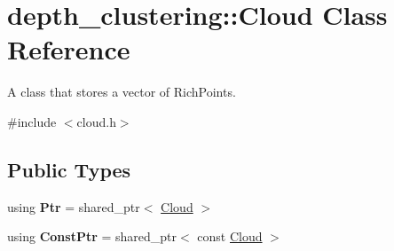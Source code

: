 \hypertarget{classdepth__clustering_1_1Cloud}{}\section{depth\+\_\+clustering\+:\+:Cloud Class Reference}
\label{classdepth__clustering_1_1Cloud}


A class that stores a vector of Rich\+Points.  




{\ttfamily \#include $<$cloud.\+h$>$}

\subsection*{Public Types}
\begin{DoxyCompactItemize}
\item 
\mbox{\label{classdepth__clustering_1_1Cloud_a6357719aeeb7c05cbd4a375f63526ba1}} 
using {\bfseries Ptr} = shared\+\_\+ptr$<$ \hyperlink{classdepth__clustering_1_1Cloud}{Cloud} $>$
\item 
\mbox{\label{classdepth__clustering_1_1Cloud_ae8ba86a4493a06d04e25cba4e97b9787}} 
using {\bfseries Const\+Ptr} = shared\+\_\+ptr$<$ const \hyperlink{classdepth__clustering_1_1Cloud}{Cloud} $>$
\end{DoxyCompactItemize}
